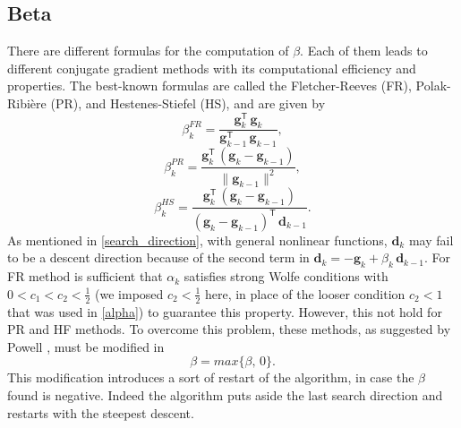 \subsection{Beta}\label{sec:beta}
There are different formulas for the computation of $\beta$. Each of them leads to different conjugate gradient methods with its computational efficiency and properties. The best-known formulas are called the Fletcher-Reeves (FR), Polak-Ribière (PR), and Hestenes-Stiefel (HS), and are given by 
\begin{equation}
  \beta_k^{FR} = \frac{\mathbf{g}_k^\mathsf{T} \, \mathbf{g}_k}{\mathbf{g}_{k-1}^\mathsf{T} \, \mathbf{g}_{k-1}},  
\end{equation}
\begin{equation}
  \beta_k^{PR} = \frac{\mathbf{g}_k^\mathsf{T} \, (\mathbf{g}_k - \mathbf{g}_{k-1})}{\|\mathbf{g}_{k-1}\|^2},  
\end{equation}
\begin{equation}
  \beta_k^{HS} = \frac{\mathbf{g}_k^\mathsf{T} \, (\mathbf{g}_k - \mathbf{g}_{k-1})}{(\mathbf{g}_k - \mathbf{g}_{k-1})^\mathsf{T} \, \mathbf{d}_{k-1}}.  
\end{equation}
As mentioned in \ref{search_direction}, with general nonlinear functions, $\mathbf{d}_k$ may fail to be a descent direction because of the second term in $\mathbf{d}_k = -\mathbf{g}_k + \beta_k\, \mathbf{d}_{k-1}$. For FR method is sufficient that $\alpha_k$ satisfies strong Wolfe conditions with $0 < c_1 < c_2 < \frac{1}{2}$ (we imposed $c_2 < \frac{1}{2}$ here, in place of the looser condition $c_2 < 1$ that was used in \ref{alpha}) to guarantee this property. However, this not hold for PR and HF methods. To overcome this problem, these methods, as suggested by Powell \cite{powell}, must be modified in
\begin{equation}\label{beta_modified}
  \beta = max\{\beta, \, 0\}.  
\end{equation}
This modification introduces a sort of restart of the algorithm, in case the $\beta$ found is negative. Indeed the algorithm puts aside the last search direction and restarts with the steepest descent.

